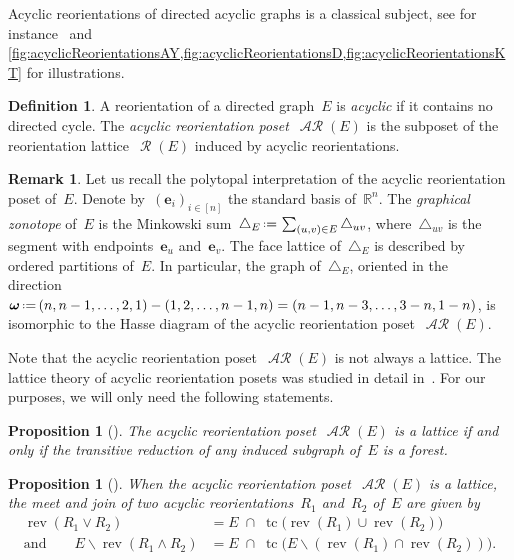 \documentclass{amsart}
\newtheorem{proposition}[theorem]{Proposition}
\theoremstyle{definition}
\newtheorem{definition}[theorem]{Definition}
\newtheorem{remark}[theorem]{Remark}
\newcommand{\R}{\mathbb{R}} %
\renewcommand{\b}[1]{\boldsymbol{#1}} %
\renewcommand{\c}[1]{\mathcal{#1}} %
\newcommand{\ssm}{\smallsetminus} %
\newcommand{\eqdef}{\mbox{\,\raisebox{0.2ex}{\scriptsize\ensuremath{\mathrm:}}\ensuremath{=}\,}} %
\newcommand{\simplex}{\triangle} %
\DeclareMathOperator{\tc}{tc} %
\newcommand{\darkblue}{\color{darkblue}} %
\newcommand{\defn}[1]{\textsl{\darkblue #1}} %
\newcommand{\meet}{\wedge} %
\newcommand{\join}{\vee} %
\DeclareMathOperator{\Reori}{\c{R}}  %
\DeclareMathOperator{\AReori}{\c{AR}}  %
\DeclareMathOperator{\rev}{rev} %
\begin{document}
Acyclic reorientations of directed acyclic graphs is a classical subject, see for instance~\cite{Greene,GreeneZaslavsky,Pilaud-acyclicReorientationLattices} and \cref{fig:acyclicReorientationsAY,fig:acyclicReorientationsD,fig:acyclicReorientationsKT} for illustrations.

\begin{definition}
\label{def:AReori}
A reorientation of a directed graph~$E$ is \defn{acyclic} if it contains no directed cycle.
The \defn{acyclic reorientation poset}~$\AReori(E)$ is the subposet of the reorientation lattice~$\Reori(E)$ induced by acyclic reorientations.
\end{definition}

\begin{remark}
Let us recall the polytopal interpretation of the acyclic reorientation poset of~$E$.
Denote by~$(\b{e}_i)_{i \in [n]}$ the standard basis of~$\R^n$.
The \defn{graphical zonotope} of~$E$ is the Minkowski sum~$\simplex_E \eqdef \sum_{(u,v) \in E} \simplex_{uv}$, where~$\simplex_{uv}$ is the segment with endpoints~$\b{e}_u$ and~$\b{e}_v$.
The face lattice of~$\simplex_E$ is described by ordered partitions of~$E$.
In particular, the graph of~$\simplex_E$, oriented in the direction~$\b{\omega} \eqdef (n, n-1, \dots, 2, 1) - (1, 2, \dots, n-1, n) = (n-1, n-3, \dots, 3-n, 1-n)$, is isomorphic to the Hasse diagram of the acyclic reorientation poset~$\AReori(E)$.
\end{remark}

Note that the acyclic reorientation poset~$\AReori(E)$ is not always a lattice.
The lattice theory of acyclic reorientation posets was studied in detail in~\cite{Pilaud-acyclicReorientationLattices}.
For our purposes, we will only need the following statements.

\begin{proposition}[{\cite[Thm.~1]{Pilaud-acyclicReorientationLattices}}]
\label{prop:AReoriLat}
The acyclic reorientation poset~$\AReori(E)$ is a lattice if and only if the transitive reduction of any induced subgraph of~$E$ is a forest.
\end{proposition}

\begin{proposition}[{\cite[Thm.~9]{Pilaud-acyclicReorientationLattices}}]
\label{prop:AReoriLatJoinMeet}
When the acyclic reorientation poset~$\AReori(E)$ is a lattice, the meet and join of two acyclic reorientations~$R_1$ and~$R_2$ of~$E$ are given by
\begin{align*}
\rev(R_1 \join R_2) & = E \;\cap\; \tc \!\big( \rev(R_1) \cup \rev(R_2) \big) \\
\text{and}\qquad
E \ssm \rev(R_1 \meet R_2) & = E \;\cap\; \tc \!\big( E \ssm (\rev(R_1) \cap \rev(R_2)) \big).
\end{align*}
\end{proposition}
\end{document}

